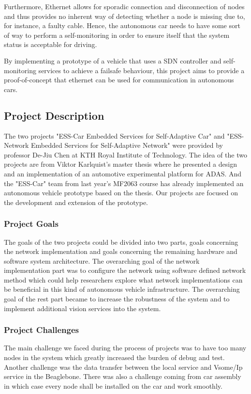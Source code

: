 \documentclass[11pt, titlepage]{article} %
\begin{document}
Furthermore, Ethernet allows for sporadic connection and disconnection of nodes and thus
provides no inherent way of detecting whether a node is missing due to, for instance, a
faulty cable. Hence, the autonomous car needs to have some sort of way to perform a
self-monitoring in order to ensure itself that the system status is acceptable
for driving.

By implementing a prototype of a vehicle that uses a SDN controller and self-monitoring
services to achieve a failsafe behaviour, this project aims to provide a proof-of-concept
that ethernet can be used for communication in autonomous cars.

\subsection{Project Description}
The two projects "ESS-Car Embedded Services for Self-Adaptive Car" and "ESS-Network Embedded Services for Self-Adaptive Network" were provided by professor De-Jiu Chen at KTH Royal Institute of Technology. The idea of the two projects are from Viktor Karlquist's master thesis \cite{Karlquist} where he presented a design and an implementation of an automotive experimental platform for ADAS. And the "ESS-Car" team from last year's MF2063 course has already implemented an autonomous vehicle prototype based on the thesis. Our projects are focused on the development and extension of the prototype.

\subsubsection{Project Goals}
The goals of the two projects could be divided into two parts, goals concerning the network implementation and goals concerning the remaining hardware and software system architecture.
The overarching goal of the network implementation part was to configure the network using software defined network method which could help researchers explore what network implementations can be beneficial in this kind of autonomous vehicle infrastructure. The overarching goal of the rest part became to increase the robustness of the system and to implement additional vision services into the system.

\subsubsection{Project Challenges}
The main challenge we faced during the process of projects was to have too many nodes in the system which greatly increased the burden of debug and test. Another challenge was the data transfer between the local service and Vsome/Ip service in the Beaglebone. There was also a challenge coming from car assembly in which case every node shall be installed on the car and work smoothly. 
\end{document}
